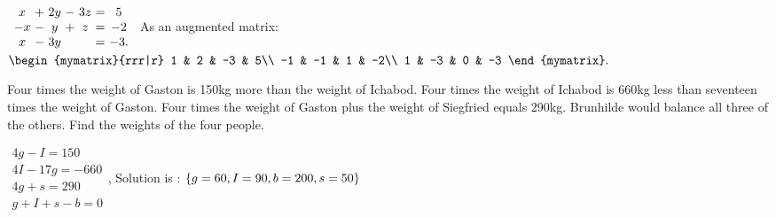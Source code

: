 \begin{enumialphparenastyle}
\begin{ex}
  \begin{sol}
    $
    \begin{array}{c@{~}c@{~}c@{~}c@{~}c@{~}c@{~}c}
      x &+& 2y &-& 3z &=& 5\\
      -x &-& y &+& z &=& -2\\
      x &-& 3y && &=& -3.\\
    \end{array}
    $
    As an augmented matrix:
    $
    \begin{mymatrix}{rrr|r}
      1 & 2 & -3 & 5\\
      -1 & -1 & 1 & -2\\
      1 & -3 & 0 & -3
    \end{mymatrix}.
    $
  \end{sol}
\end{ex}


\begin{ex}
Four times the weight of Gaston is 150kg more than the weight of
Ichabod. Four times the weight of Ichabod is 660kg less than seventeen
times the weight of Gaston. Four times the weight of Gaston plus the weight
of Siegfried equals 290kg. Brunhilde would balance all three of the
others. Find the weights of the four people.
\begin{sol}
  $\begin{array}{c}
     4g-I=150 \\
     4I-17g=-660 \\
     4g+s=290 \\
     g+I+s-b=0
   \end{array}
   $, Solution is : $\left\{g=60,I=90,b=200,s=50\right\} $
 \end{sol}
\end{ex}

\end{enumialphparenastyle}

